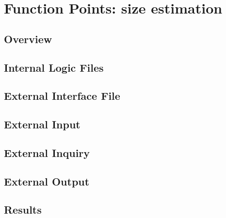 
\section{Function Points: size estimation}
\subsection{Overview} %


\subsection{Internal Logic Files} %


\subsection{External Interface File} %

\subsection{External Input} %

\subsection{External Inquiry} %


\subsection{External Output} %



\subsection{Results} %



